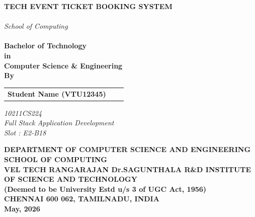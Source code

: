 \documentclass[12pt]{report}
\begin{document}
 
\newpage
\begingroup
\pagecolor{lightblue} %
\color{black}     %
\thispagestyle{empty}

\begin{center}
    \LARGE{\textsc {\textbf{TECH EVENT TICKET BOOKING SYSTEM}}}\\[0.2cm]
    \vspace{0.2cm}
    \Large{\textit{\\School of Computing}}\\[0.3cm]
    
    \Large{\textbf{\\Bachelor of Technology\\in \\Computer Science \& Engineering}}
    \vspace{0.5cm}
    \Large{\textbf{\\By}}\\[0.5cm]
    
    \begin{table}[h] 
    \centering 
    \Large{\color{red} %
    \begin{tabular}{>{\bfseries} lc>{\bfseries}r} Student Name (VTU12345)\\ 
    \end{tabular}} 
    \end{table} 
    
    \large{\textit{10211CS224}}\\ 
    \large{\textit{Full Stack Application Development\\ Slot : E2-B18}}\\ 
    \vspace{0.5cm} 
    
    \vspace{0.5cm}
    \large{\textbf{DEPARTMENT OF COMPUTER SCIENCE AND ENGINEERING}}\\ 
    \large{\textbf{SCHOOL OF COMPUTING}}\\ 
    \vspace{.5cm}
    \Large{\textbf{VEL TECH RANGARAJAN Dr.SAGUNTHALA R\&D INSTITUTE OF SCIENCE AND TECHNOLOGY\\ (Deemed to be University Estd u/s 3 of UGC Act, 1956)}}\\ 
    \large{\textbf{CHENNAI 600 062, TAMILNADU, INDIA}} 
    \vspace{0.5cm}
    \large{\textbf{\\May, 2026}}\\ 
\end{center} 
\clearpage
\nopagecolor %
\color{black} %
\endgroup
 
\end{document}
